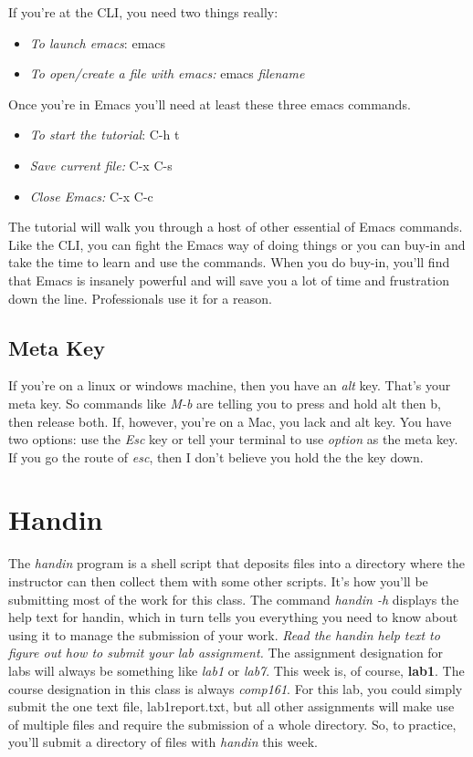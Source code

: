 \documentclass[]{tufte-handout}
\begin{document}
If you're at the CLI, you need two things really:
\begin{itemize}
\item \textit{To launch emacs}: emacs
\item \textit{To open/create a file with emacs:} emacs \textit{filename}
\end{itemize}

Once you're in Emacs you'll need at least these three emacs commands.
\begin{itemize}
\item \textit{To start the tutorial}: C-h t
\item \textit{Save current file:} C-x C-s
\item \textit{Close Emacs:} C-x C-c
\end{itemize}

The tutorial will walk you through a host of other essential of Emacs commands.  Like the CLI, you can fight the Emacs way of doing things or you can buy-in and take the time to learn and use the commands. When you do buy-in, you'll find that Emacs is insanely powerful and will save you a lot of time and frustration down the line. Professionals use it for a reason.

\subsection{Meta Key}

If you're on a linux or windows machine, then you have an \textit{alt} key. That's your meta key. So commands like \textit{M-b} are telling you to press and hold alt then b, then release both. If, however, you're on a Mac, you lack and alt key. You have two options: use the \textit{Esc} key or tell your terminal to use \textit{option} as the meta key.  If you go the route of \textit{esc}, then I don't believe you hold the the key down.

\section{Handin}

The \textit{handin} program is a shell script that deposits files into a directory where the instructor can then collect them with some other scripts.  It's how you'll be submitting most of the work for this class. The command \textit{handin -h} displays the help text for handin, which in turn tells you everything you need to know about using it to manage the submission of your work. \textit{Read the handin help text to figure out how to submit your lab assignment.} The assignment designation for labs will always be something like \textit{lab1} or \textit{lab7}.  This week is, of course, \textbf{lab1}.  The course designation in this class is always \textit{comp161}.  For this lab, you could simply submit the one text file, lab1report.txt, but all other assignments will make use of multiple files and require the submission of a whole directory. So, to practice, you'll submit a directory of files with \textit{handin} this week. 
\end{document}
